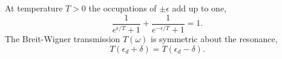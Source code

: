 \documentclass{article}
\begin{document}
At temperature $T>0$ the occupations of $\pm\epsilon$ add up to one,
\begin{equation}
\frac{1}{e^{\epsilon/T}+1} + \frac{1}{e^{-\epsilon/T}+1} = 1 .
\label{eq:ph}
\end{equation}
The Breit-Wigner transmission $T(\omega)$ is symmetric about the resonance,
\begin{equation}
T(\epsilon_d+\delta) = T(\epsilon_d-\delta) .
\label{eq:sym}
\end{equation}
\end{document}

